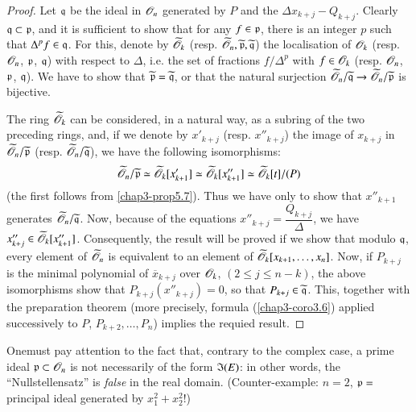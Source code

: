 \begin{proof}
Let $\mathfrak{q}$ be the ideal in $\mathscr{O}_{n}$ generated by $P$ and the $\Delta x_{k+j}-Q_{k+j}$. Clearly $\mathfrak{q}\subset \mathfrak{p}$, and it is sufficient to show that for any $f\in \mathfrak{p}$, there is an integer $p$ such that $\Delta^{p}f\in \mathfrak{q}$. For this, denote by $\widetilde{\mathscr{O}}_{k}$ (resp. $\widetilde{\mathscr{O}}_{n},\widetilde{\mathfrak{p}},\widetilde{\mathfrak{q}}$) the localisation of $\mathscr{O}_{k}$ (resp. $\mathscr{O}_{n}$, $\mathfrak{p}$, $\mathfrak{q}$) with respect to $\Delta$, i.e. the set of fractions $f/\Delta^{p}$ with $f\in \mathscr{O}_{k}$ (resp. $\mathscr{O}_{n}$, $\mathfrak{p}$, $\mathfrak{q}$). We have to show that $\widetilde{\mathfrak{p}}=\widetilde{\mathfrak{q}}$, or that the natural surjection $\widetilde{\mathscr{O}}_{n}/\widetilde{\mathfrak{q}}\to \widetilde{\mathscr{O}}_{n}/\widetilde{\mathfrak{p}}$ is bijective.

The ring $\widetilde{\mathscr{O}}_{k}$ can be considered, in a natural way, as a subring of the two preceding rings, and, if we denote by $x'_{k+j}$ (resp. $x''_{k+j}$) the image of $x_{k+j}$ in $\widetilde{\mathscr{O}}_{n}/\widetilde{\mathfrak{p}}$ (resp. $\widetilde{\mathscr{O}}_{n}/\widetilde{\mathfrak{q}}$), we have the following isomorphisms:
$$
\widetilde{\mathscr{O}}_{n}/\widetilde{\mathfrak{p}}\simeq \widetilde{\mathscr{O}}_{k}[x'_{k+1}]\simeq \widetilde{\mathscr{O}}_{k}[x''_{k+1}]\simeq \widetilde{\mathscr{O}}_{k}[t]/(P)
$$
(the first follows from \ref{chap3-prop5.7}). Thus we have only to show that $x''_{k+1}$ generates $\widetilde{\mathscr{O}}_{n}/\widetilde{\mathfrak{q}}$. Now, because of the equations $x''_{k+j}=\dfrac{Q_{k+j}}{\Delta}$, we have $x''_{k+j}\in \widetilde{\mathscr{O}}_{k}[x''_{k+1}]$. Consequently, the result will be proved if we show that modulo $\mathfrak{q}$, every element of $\widetilde{\mathscr{O}}_{n}$ is equivalent to an element of $\widetilde{\mathscr{O}}_{k}[x_{k+1},\ldots,x_{n}]$. Now, if $P_{k+j}$ is the minimal polynomial of $\overline{x}_{k+j}$ over $\mathscr{O}_{k}$, $(2\leq j\leq n-k)$, the above isomorphisms show that $P_{k+j}(x''_{k+j})=0$, so that $P_{k+j}\in \widetilde{\mathfrak{q}}$. This, together with the preparation theorem (more precisely, formula (\ref{chap3-coro3.6}) applied successively to $P$, $P_{k+2},\ldots,P_{n}$) implies the requied result.
\end{proof}

\begin{remark}\label{chap3-rem5.9}
One\pageoriginale must pay attention to the fact that, contrary to the complex case, a prime ideal $\mathfrak{p}\subset \mathscr{O}_{n}$ is not necessarily of the form $\mathfrak{I}(E)$: in other words, the ``Nullstellensatz'' is {\em false} in the real domain. (Counter-example: $n=2$, $\mathfrak{p}=$ principal ideal generated by $x^{2}_{1}+x^{2}_{2}$!)
\end{remark}
